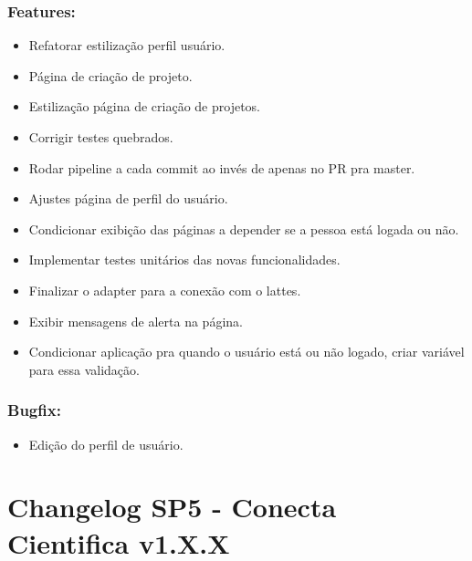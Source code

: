 \documentclass[
40pt,				%
openright,			%
oneside,			%
a4paper,			%
chapter=TITLE,		%
sumario=tradicional,
english,			%
]{abntex2}
\begin{document}
	\subsection*{\textbf{Features:}}
	\begin{itemize} \setlength\itemsep{0em}
		
		\item Refatorar estilização perfil usuário.
		\item Página de criação de projeto.
		\item Estilização página de criação de projetos.
		\item Corrigir testes quebrados.
		\item Rodar pipeline a cada commit ao invés de apenas no PR pra master.
		\item Ajustes página de perfil do usuário.
		\item Condicionar exibição das páginas a depender se a pessoa está logada ou não.
		\item Implementar testes unitários das novas funcionalidades.
		\item Finalizar o adapter para a conexão com o lattes.
		\item Exibir mensagens de alerta na página.
		\item Condicionar aplicação pra quando o usuário está ou não logado, criar variável para essa validação.

	\end{itemize}

	\subsection*{\textbf{Bugfix:}}
	\begin{itemize} \setlength\itemsep{0em}

		\item Edição do perfil de usuário.

	\end{itemize}

	\chapter*{Changelog SP5 - Conecta Cientifica v1.X.X} 
	
\end{document}
